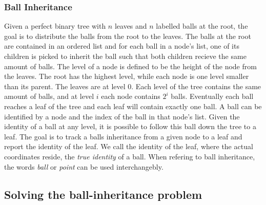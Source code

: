 

\subsubsection{Ball Inheritance}
Given a perfect binary tree with $n$ leaves and $n$ labelled balls at the root, the goal is to distribute the balls from the root to the leaves. The balls at the root are contained in an ordered list and for each ball in a node's list, one of its children is picked to inherit the ball such that both children recieve the same amount of balls. The level of a node is defined to be the height of the node from the leaves. The root has the highest level, while each node is one level smaller than its parent. The leaves are at level $0$. Each level of the tree contains the same amount of balls, and at level $i$ each node contains $2^i$ balls. Eventually each ball reaches a leaf of the tree and each leaf will contain exactly one ball. A ball can be identified by a node and the index of the ball in that node's list. Given the identity of a ball at any level, it is possible to follow this ball down the tree to a leaf. The goal is to track a balls inheritance from a given node to a leaf and report the identity of the leaf. We call the identity of the leaf, where the actual coordinates reside, the \emph{true identity} of a ball. When refering to ball inheritance, the words \emph{ball} or \emph{point} can be used interchangebly. \\




\subsection{Solving the ball-inheritance problem} 
\label{ssection:solving-ball}

